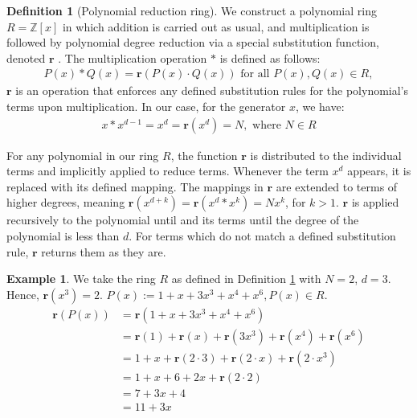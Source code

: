\documentclass{article}
\theoremstyle{plain}
\theoremstyle{definition}
\newtheorem{definition}{Definition}
\newtheorem{example}{Example}
\newcommand{\redu}{\textbf{r}}
\newcommand{\Z}{\mathbb{Z}}
\newcommand{\Rx}{R}
\begin{document}
\begin{definition}[Polynomial reduction ring] \label{definition:ring}
We construct a polynomial ring \(\Rx = \Z[x]\) in which addition is carried out as usual, and multiplication is followed by polynomial degree reduction via a special substitution function, denoted $\redu$ \cite{shunia2023polynomial}. The multiplication operation \(\ast\) is defined as follows:
\begin{align}
P(x) \ast Q(x) = \redu(P(x) \cdot Q(x)) \text{ for all } P(x), Q(x) \in \Rx,
\end{align}
\(\redu\) is an operation that enforces any defined substitution rules for the polynomial's terms upon multiplication. In our case, for the generator \(x\), we have:
\begin{align}
x \ast x^{d-1} = x^d = \redu(x^d) = N, \text{ where } N \in \Rx
\end{align}

For any polynomial in our ring $\Rx$, the function \( \redu \) is distributed to the individual terms and implicitly applied to reduce terms. Whenever the term $x^d$ appears, it is replaced with its defined mapping. The mappings in $\redu$ are extended to terms of higher degrees, meaning $\redu(x^{d+k}) = \redu(x^d \ast x^k) = N x^k$, for $k > 1$. $\redu$ is applied recursively to the polynomial until and its terms until the degree of the polynomial is less than $d$. For terms which do not match a defined substitution rule, $\redu$ returns them as they are.
\end{definition}

\begin{example}
We take the ring $R$ as defined in Definition \ref{definition:ring} with $N = 2$, $d = 3$. Hence, $\redu(x^3) = 2$. $P(x) := 1 + x + 3x^3 + x^{4} + x^{6}, P(x) \in R$.
\begin{align}
    \redu(P(x)) &= \redu(1 + x + 3x^3 + x^{4} + x^{6}) \\
    &= \redu(1) + \redu(x) + \redu(3x^3) + \redu(x^{4}) + \redu(x^{6}) \\
    &= 1 + x + \redu(2 \cdot 3) + \redu(2 \cdot x) + \redu(2 \cdot x^3) \\
    &= 1 + x + 6 + 2x + \redu(2 \cdot 2) \\
    &= 7 + 3x + 4 \\
    &= 11 + 3x
\end{align}
\end{example}
\end{document}
